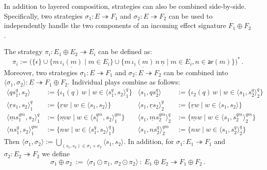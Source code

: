 \documentclass[acmsmall,screen,review,anonymous,nonacm]{acmart}
\newcommand{\kw}[1]{\ensuremath{ \mathsf{#1} }}
\begin{document}
In addition to layered composition,
strategies can also be combined side-by-side.
Specifically, two strategies
$\sigma_1 : E \twoheadrightarrow F_1$ and
$\sigma_2 : E \twoheadrightarrow F_2$
can be used to independently handle
the two components of an incoming effect signature $F_1 \oplus F_2$.

\begin{definition} %
The strategy $\pi_i : E_1 \oplus E_2 \twoheadrightarrow E_i$
can be defined as:
\[
  \pi_i := \bigl(
    \{ \epsilon \} \cup
    \{ m \, \underline{\iota_i(m)} \mid m \in E_i \} \cup
    \{ m \, \underline{\iota_i(m)} \, n \, \underline{n} \mid
       m \in E_i, n \in \kw{ar}(m) \}
  \big)^*
  \,.
\]
Moreover,
two strategies
$\sigma_1 : E \twoheadrightarrow F_1$ and
$\sigma_2 : E \twoheadrightarrow F_2$
can be combined into
$\langle \sigma_1, \sigma_2 \rangle : E \twoheadrightarrow F_1 \oplus F_2$.
Individual plays combine as follows:
\begin{align*}
  \langle qs_1^q , s_2 \rangle &:=
    \{ \iota_1(q) \, w \mid w \in \langle s_1^q, s_2 \rangle^q_1 \} &
  \langle s_1 , qs_2^q \rangle &:=
    \{ \iota_2(q) \, w \mid w \in \langle s_1, s_2^q \rangle^q_2 \}
  \\
  \langle \underline{r} s_1, s_2 \rangle_1^q &:=
    \{ \underline{r} w \mid w \in \langle s_1, s_2 \rangle \} &
  \langle s_1, \underline{r} s_2 \rangle_2^q &:=
    \{ \underline{r} w \mid w \in \langle s_1, s_2 \rangle \}
  \\
  \langle \underline{m} s_1^{qm}, s_2 \rangle_1^q &:=
    \{ \underline{m} w \mid w \in \langle s_1^{qm}, s_2 \rangle^{qm}_1 \} &
  \langle s_1, \underline{m} s_2^{qm} \rangle_2^q &:=
    \{ \underline{m} w \mid w \in \langle s_1, s_2^{qm} \rangle^{qm}_2 \}
  \\
  \langle n s_1^q, s_2 \rangle^{qm}_1 &:=
    \{ n w \mid w \in \langle s_1^q, s_2 \rangle^q_1 \} &
  \langle s_1, n s_2^q \rangle^{qm}_2 &:=
    \{ n w \mid w \in \langle s_1, s_2^q \rangle^q_2 \}
\end{align*}
Then
$\langle \sigma_1, \sigma_2 \rangle :=
 \bigcup_{(s_1, s_2) \in \sigma_1 \times \sigma_2}
   \langle s_1, s_2 \rangle$.
In addition,
for $\sigma_1 : E_1 \twoheadrightarrow F_1$ and
$\sigma_2 : E_2 \twoheadrightarrow F_2$
we define
\[
  \sigma_1 \oplus \sigma_2 \: := \:
    \langle \sigma_1 \odot \pi_1, \, \sigma_2 \odot \pi_2 \rangle
    \: : \:
    E_1 \oplus E_2 \twoheadrightarrow F_1 \oplus F_2
  \,.
\]
\end{definition}
\end{document}

